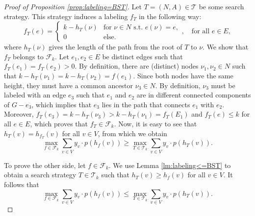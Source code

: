 \documentclass[11pt]{article}
\newcommand{\BSTs}{\mathcal{T}}
\newcommand\+{\mkern2mu}
\begin{document}
\begin{proof}[Proof of Proposition \ref{prop:labeling=BST}]
    Let $T=(N, A) \in \BSTs$ be some search strategy. This strategy induces a labeling $f_T$ in the following way:
    $$
        f_T(e) = \begin{cases}
            k - h_T(\nu) & \text{for $\nu \in N$ s.t. $e(\nu) = e$}, \\
            0 & \text{else.}
        \end{cases}, \quad \text{for all } e \in E,
    $$
    where $h_T(\nu)$ gives the length of the path from the root of $T$ to $\nu$.
    We show that $f_T$ belongs to $\mathcal{F}_k$. Let $e_1, e_2 \in E$ be distinct edges such that $f_T(e_1) = f_T(e_2)>0$. By definition, there are (distinct) nodes $\nu_1, \nu_2 \in N$ such that $k - h_T(\nu_1) = k - h_T(\nu_2) = f(e_1)$. Since both nodes have the same height, they must have a common ancestor $\nu_3 \in N$. By definition, $\nu_3$ must be labeled with an edge $e_3$ such that $e_1$ and $e_2$ are in different connected components of $G - e_3$, which implies that $e_3$ lies in the path that connects $e_1$ with $e_2$. Moreover, $f_T(e_3) = k - h_T(\nu_3) > k - h_T(\nu_1) = f_T(E_1)$ and $f_T(e) \leq k$ for all $e \in E$, which proves that $f_T \in \mathcal{F}_k$. Now, it is easy to see that $h_T(v) = h_{f_T}(v)$ for all $v \in V$, from which we obtain
    $$
    \max_{f\in \mathcal{F}_k} \sum_{v \in V} y_v \cdot p(h_f(v)) \geq \max_{T \in \BSTs_k} \sum_{v \in V} y_v \cdot p(h_T(v)).
    $$

    To prove the other side, let $f \in \mathcal{F}_k$. We use Lemma \ref{lm:labeling<=BST} to obtain a search strategy $T \in \BSTs_k$ such that $h_T(v) \geq h_f(v)$ for all $v \in V$. It follows that
    $$
    \max_{f \in \mathcal{F}_k} \sum_{v \in V} y_v \cdot p(h_f(v)) \leq \max_{T \in \BSTs_k} \sum_{v \in V} y_v \cdot p(h_T(v)).
    $$
\end{proof}


\end{document}
